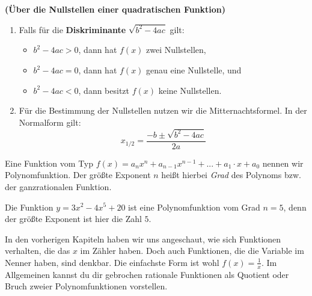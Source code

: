 \documentclass[ngerman, 12pt]{nssheetxea}
\begin{document}
\begin{theorem} \textbf{(Über die Nullstellen einer quadratischen Funktion)} \par
\begin{enumerate}
\item Falls für die \textbf{Diskriminante} $\sqrt{b^2-4ac}$ gilt:
	\begin{itemize}
	\item $b^2-4ac>0$, dann hat $f(x)$ zwei Nullstellen,
	\item $b^2-4ac=0$, dann hat $f(x)$ genau eine Nullstelle, und
	\item $b^2-4ac<0$, dann besitzt $f(x)$ keine Nullstellen.
	\end{itemize}
 
\item Für die Bestimmung der Nullstellen nutzen wir die Mitternachtsformel. In der Normalform gilt:
\[ x_{1/2}=\dfrac{-b\pm\sqrt{b^2-4ac}}{2a} \]

\end{enumerate}



\end{theorem}

\begin{definition}
Eine Funktion vom Typ $f(x)=a_nx^n + a_{n-1}x^{n-1} + ... + a_1 \cdot x + a_0$ nennen wir Polynomfunktion. Der größte Exponent $n$ heißt hierbei \textit{Grad} des Polynoms bzw. der ganzrationalen Funktion.
   
\end{definition}

\begin{example}
Die Funktion $y=3x^2-4x^5+20$ ist eine Polynomfunktion vom Grad $n=5$, denn der größte Exponent ist hier die Zahl $5$.
\end{example}

In den vorherigen Kapiteln haben wir uns angeschaut, wie sich Funktionen verhalten, die das $x$ im Zähler haben. Doch auch Funktionen, die die Variable im Nenner haben, sind denkbar. Die einfachste Form ist wohl $f(x)=\frac{1}{x}$. Im Allgemeinen kannst du dir gebrochen rationale Funktionen als Quotient oder Bruch zweier Polynomfunktionen vorstellen. 
\end{document}
